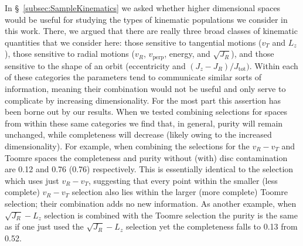 In \S~\ref{subsec:SampleKinematics} we asked whether higher dimensional spaces would be useful for studying the types of kinematic populations we consider in this work. There, we argued that there are really three broad classes of kinematic quantities that we consider here: those sensitive to tangential motions ($v_{T}$ and $L_{z}$), those sensitive to radial motions ($v_{R}$, $v_\mathrm{perp}$, energy, and $\sqrt{J_{R}}$), and those sensitive to the shape of an orbit (eccentricity and $(J_{z}-J_{R})/J_\mathrm{tot})$. Within each of these categories the parameters tend to communicate similar sorts of information, meaning their combination would not be useful and only serve to complicate by increasing dimensionality. For the most part this assertion has been borne out by our results. When we tested combining selections for spaces from within these same categories we find that, in general, purity will remain unchanged, while completeness will decrease (likely owing to the increased dimensionality). For example, when combining the selections for the $v_{R}-v_{T}$ and Toomre spaces the completeness and purity without (with) disc contamination are 0.12 and 0.76 (0.76) respectively. This is essentially identical to the selection which uses just $v_{R}-v_{T}$, suggesting that every point within the smaller (less complete) $v_{R}-v_{T}$ selection also lies within the larger (more complete) Toomre selection; their combination adds no new information. As another example, when $\sqrt{J_{R}}-L_{z}$ selection is combined with the Toomre selection the purity is the same as if one just used the $\sqrt{J_{R}}-L_{z}$ selection yet the completeness falls to 0.13 from 0.52. 

